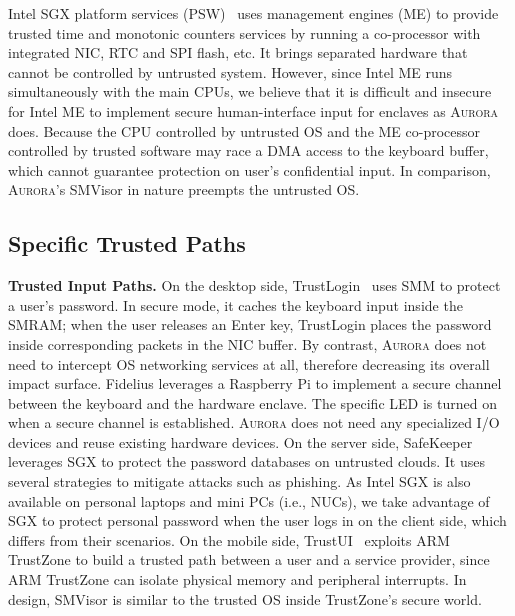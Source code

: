 Intel SGX platform services (PSW)~\cite{intel_psw} uses management engines (ME) to provide trusted time and monotonic counters services by running a co-processor with integrated NIC, RTC and SPI flash, etc. It brings separated hardware that cannot be controlled by untrusted system. However, since Intel ME runs simultaneously with the main CPUs, we believe that it is difficult and insecure for Intel ME to implement secure human-interface input for enclaves as \textsc{Aurora} does. Because the CPU controlled by untrusted OS and the ME co-processor controlled by trusted software may race a DMA access  to the keyboard buffer, which cannot guarantee protection on user's confidential input. In comparison, \textsc{Aurora}'s SMVisor in nature preempts the untrusted OS.

\subsection{Specific Trusted Paths}

\textbf{Trusted Input Paths.}
On the desktop side, TrustLogin~\cite{zhang_trustlogin:_2015} uses SMM to protect a user's password. In secure mode, it caches the keyboard input inside the SMRAM; when the user releases an \textsf{Enter} key, TrustLogin places the password inside corresponding packets in the NIC buffer. By contrast, \textsc{Aurora} does not need to intercept OS networking services at all, therefore decreasing its overall impact surface.
Fidelius \cite{DBLP:journals/corr/abs-1809-04774} leverages a Raspberry Pi to implement a secure channel between the keyboard and the hardware enclave. The specific LED is turned on when a secure channel is established.  \textsc{Aurora} does not need any specialized I/O devices and reuse existing hardware devices.
On the server side, SafeKeeper~\cite{DBLP:conf/www/KrawieckaKPMA18} leverages SGX to protect the password databases on untrusted clouds. It uses several strategies to mitigate attacks such as phishing. As Intel SGX is also available on personal laptops and mini PCs (i.e., NUCs), we take advantage of SGX to protect personal password when the user logs in on the client side, which differs from their scenarios.
On the mobile side, TrustUI~\cite{DBLP:conf/apsys/LiMHXZCL14} exploits ARM TrustZone to build a trusted path between a user and a service provider, since ARM TrustZone can isolate physical memory and peripheral interrupts. In design, SMVisor is similar to the trusted OS inside TrustZone's secure world.


